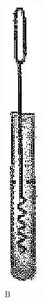 \documentclass[10pt]{article}
\begin{document}
\begin{figure}[h]
\begin{center}
  \includegraphics[width=\textwidth]{2025_10_23_fa9073eecee116ad8cf2g-81(1)}
\captionsetup{labelformat=empty}
\caption{B}
\end{center}
\end{figure}
\end{document}
